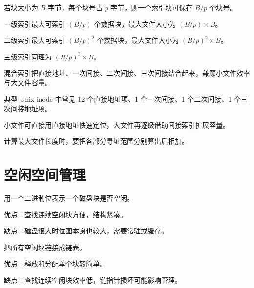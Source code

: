 \begin{points}
  \item 若块大小为 $B$ 字节，每个块号占 $p$ 字节，则一个索引块可保存 $B/p$ 个块号。
  \item 一级索引最大可索引 $(B/p)$ 个数据块，最大文件大小为 $(B/p)\times B$。
  \item 二级索引最大可索引 $(B/p)^2$ 个数据块，最大文件大小为 $(B/p)^2\times B$。
  \item 三级索引同理为 $(B/p)^3\times B$。
\end{points}


\begin{points}
  \item 混合索引把直接地址、一次间接、二次间接、三次间接结合起来，兼顾小文件效率与大文件容量。
  \item 典型 Unix inode 中常见 12 个直接地址项、1 个一次间接、1 个二次间接、1 个三次间接地址项。
  \item 小文件可直接用直接地址快速定位，大文件再逐级借助间接索引扩展容量。
  \item 计算最大文件长度时，要把各部分寻址范围分别算出后相加。
\end{points}

\section{空闲空间管理}
\begin{points}
  \item 用一个二进制位表示一个磁盘块是否空闲。
  \item 优点：查找连续空闲块方便，结构紧凑。
  \item 缺点：磁盘很大时位图本身也较大，需要常驻或缓存。
\end{points}


\begin{points}
  \item 把所有空闲块链接成链表。
  \item 优点：释放和分配单个块较简单。
  \item 缺点：查找连续空闲块效率低，链指针损坏可能影响管理。
\end{points}


